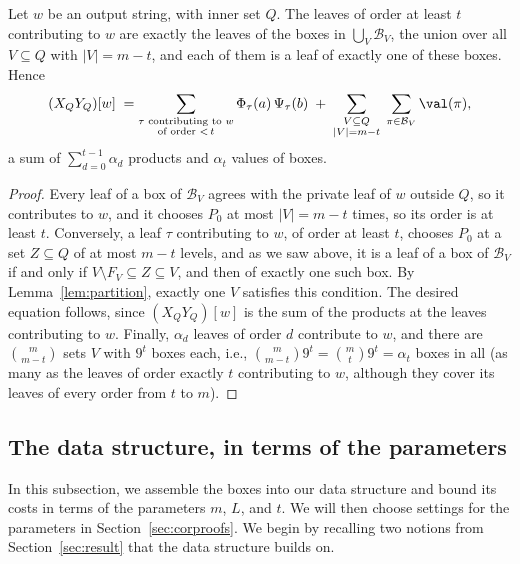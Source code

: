 \begin{lemma}\label{lem:boxes}
Let $w$ be an output string, with inner set $Q$. The leaves of order at least $t$ contributing to $w$ are exactly the leaves of the boxes in $\bigcup_V\mathcal B_V$, the union over all $V\subseteq Q$ with $|V|=m-t$, and each of them is a leaf of exactly one of these boxes. Hence
\[
(X_QY_Q)[w]\;=\sum_{\substack{\tau\text{ contributing to }w\\\text{of order }<\,t}}\Phi_\tau(a)\,\Psi_\tau(b)\;+\;\sum_{\substack{V\subseteq Q\\|V|=m-t}}\;\sum_{\pi\in\mathcal B_V}\val(\pi),
\]
a sum of $\sum_{d=0}^{t-1}\alpha_d$ products and $\alpha_{t}$ values of boxes.
\end{lemma}

\begin{proof}
Every leaf of a box of $\mathcal B_V$ agrees with the private leaf of $w$ outside $Q$, so it contributes to $w$, and it chooses $P_0$ at most $|V|=m-t$ times, so its order is at least $t$. Conversely, a leaf $\tau$ contributing to $w$, of order at least $t$, chooses $P_0$ at a set $Z\subseteq Q$ of at most $m-t$ levels, and as we saw above, it is a leaf of a box of $\mathcal B_V$ if and only if $V\setminus F_V\subseteq Z\subseteq V$, and then of exactly one such box. By Lemma~\ref{lem:partition}, exactly one $V$ satisfies this condition. The desired equation follows, since $(X_QY_Q)[w]$ is the sum of the products at the leaves contributing to $w$. Finally, $\alpha_d$ leaves of order $d$ contribute to $w$, and there are $\binom m{m-t}$ sets $V$ with $9^t$ boxes each, i.e., $\binom m{m-t}9^t=\binom mt9^t=\alpha_t$ boxes in all (as many as the leaves of order exactly $t$ contributing to $w$, although they cover its leaves of every order from $t$ to $m$).
\end{proof}

\subsection{The data structure, in terms of the parameters}\label{sec:single}

In this subsection, we assemble the boxes into our data structure and bound its costs in terms of the parameters $m$, $L$, and $t$. We will then choose settings for the parameters in Section~\ref{sec:corproofs}. We begin by recalling two notions from Section~\ref{sec:result} that the data structure builds on.

